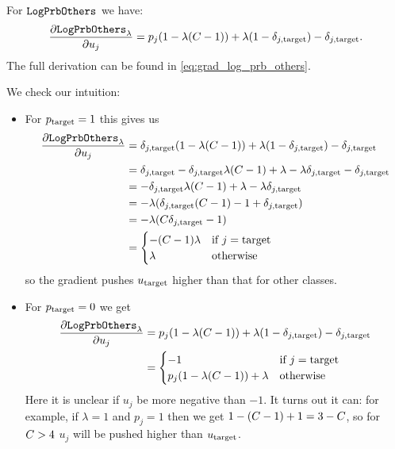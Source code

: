 \documentclass[../main.tex]{subfiles}
\begin{document}
For $\mathtt{LogPrbOthers}_{}$ we have:
\begin{align*}
    \frac{\partial \mathtt{LogPrbOthers}_{\lambda}}{\partial u_j}
     = p_j (1 - \lambda (C - 1)) + \lambda (1 - \delta_{j, \mathrm{target}}) - \delta_{j, \mathrm{target}}.
\end{align*}
The full derivation can be found in \autoref{eq:grad_log_prb_others}.

We check our intuition:
\begin{itemize}
    \item For $p_{\mathrm{target}} = 1$ this gives us
          \begin{align*}
              \frac{\partial \mathtt{LogPrbOthers}_{\lambda}}{\partial u_j}
               & = \delta_{j, \mathrm{target}} (1 - \lambda (C - 1)) + \lambda (1 - \delta_{j, \mathrm{target}}) - \delta_{j, \mathrm{target}}      \\
               & = \delta_{j, \mathrm{target}} - \delta_{j, \mathrm{target}} \lambda (C - 1) + \lambda - \lambda \delta_{j, \mathrm{target}} - \delta_{j, \mathrm{target}} \\
               & = - \delta_{j, \mathrm{target}} \lambda (C - 1) + \lambda - \lambda \delta_{j, \mathrm{target}}             \\
               & = - \lambda (\delta_{j, \mathrm{target}} (C - 1) - 1 + \delta_{j, \mathrm{target}})                         \\
               & = - \lambda (C \delta_{j, \mathrm{target}} - 1)                                      \\
               & = \begin{cases}
                       - (C - 1) \lambda & \text{if } j = \mathrm{target} \\
                       \lambda                    & \text{otherwise}
                   \end{cases}
          \end{align*}
          so the gradient pushes $u_{\mathrm{target}}$ higher than that for other classes.

    \item For $p_{\mathrm{target}} = 0$ we get
          \begin{align*}
              \frac{\partial \mathtt{LogPrbOthers}_{\lambda}}{\partial u_j}
               & = p_j (1 - \lambda (C - 1)) + \lambda (1 - \delta_{j, \mathrm{target}}) - \delta_{j, \mathrm{target}}        \\
               & = \begin{cases}
                       -1                                           & \text{if } j = \mathrm{target} \\
                       p_j(1 - \lambda ( C -1 )) + \lambda & \text{otherwise}
                   \end{cases}
          \end{align*}
Here it is unclear if $u_j$ be more negative than $-1$.
It turns out it can: for example, if $\lambda = 1$ and $p_j = 1$ then we get $1 - (C -1) + 1 = 3 - C$, so for $C > 4$ $u_j$ will be pushed higher than $u_{\mathrm{target}}$.
\end{itemize}
\end{document}

